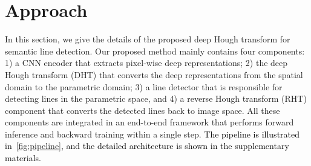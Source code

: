 \documentclass[10pt,journal,cspaper,compsoc]{IEEEtran}
\newcommand{\revise}[1]{{\textcolor{black}{#1}}}
\newcommand{\CheckRmv}[1]{}
\newcommand{\CheckRmv}[1]{#1}
\begin{document}
\section{Approach}\label{sec:dht}
In this section, we give the details of the proposed deep Hough transform for semantic line
detection.
Our proposed method mainly contains four components:
1) a CNN encoder that extracts pixel-wise deep representations;
2) the deep Hough transform (DHT) that converts the deep representations from the spatial domain to the parametric domain;
3) a line detector that is responsible for detecting lines in the parametric space, and
4) a reverse Hough transform (RHT) component that converts the detected lines back to image space.
All these components are integrated in an end-to-end framework that performs forward inference and backward training within a single step.
\revise{The pipeline is illustrated in~\cref{fig:pipeline}, and the detailed architecture is shown in the supplementary materials.}


\CheckRmv{
\begin{figure*}[tb!]
  \centering
  \begin{overpic}[scale=0.52]{figures/pipeline.pdf}
    \put(31, 28){$X$}
    \put(54, 28){$Y$}
    \put(40.2, 13.9){$\mathcal{H}$}
    \put(40.2, 17.65){$\mathcal{H}$}
    \put(40.2, 21.45){$\mathcal{H}$}
    \put(40.2, 25.35){$\mathcal{H}$}
    \put(83.65, 11.5){$\mathcal{R}$}
    \put(41.7, 1){$\mathcal{H}$}
    \put(55.3, 1){$\mathcal{R}$}

    \put(67.15, 1.2){\scriptsize CTX}

    \put(64.1, 14.2){\scriptsize CTX}
    \put(64.1, 18.4){\scriptsize CTX}
    \put(64.1, 21.5){\scriptsize CTX}
    \put(64.1, 25){\scriptsize CTX}

    \put(88.6, 19){\scriptsize Loss}
    \put(85, 27){\small Training only}
    \put(93.5, 7.5){\small Testing}
    \put(94.5, 5){\small only}
    \put(5, 0.8){Upsample + Concat}
    \put(30, 0.8){Add}
    \put(47, 0.8){DHT}
    \put(60, 0.8){RHT}
    \put(72, 0.8){CTX}
  \end{overpic}
\caption{
    \revise{The pipeline of our proposed method. DHT is short for the proposed Deep Hough Transform,
    and RHT represents the Reverse Hough Transform. CTX means the context-aware line detector which contains 
    multiple convolutional layers.}
  }\label{fig:pipeline}
\end{figure*}
}
\end{document}
